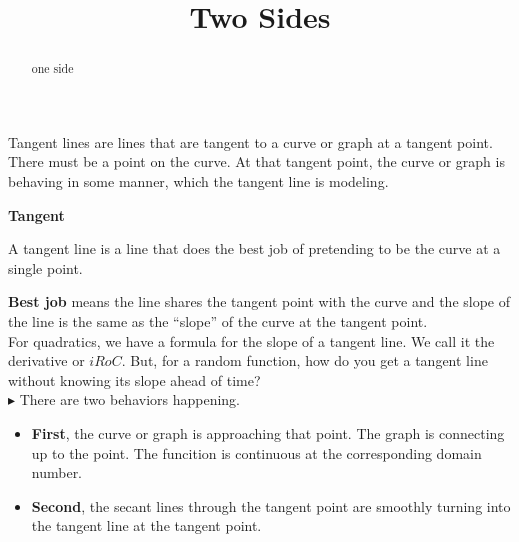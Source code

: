 \documentclass{ximera}
\title{Two Sides}
\begin{document}
\begin{abstract}
one side
\end{abstract}
\maketitle



Tangent lines are lines that are tangent to a curve or graph at a tangent point. There must be a point on the curve. At that tangent point, the curve or graph is behaving in some manner, which the tangent line is modeling.  \\

\begin{idea} \textbf{\textcolor{blue!55!black}{Tangent}}


A tangent line is a line that does the best job of pretending to be the curve at a single point.
\end{idea}


\textbf{Best job} means the line shares the tangent point with the curve and the slope of the line is the same as the ``slope'' of the curve at the tangent point. \\


For quadratics, we have a formula for the slope of a tangent line. We call it the derivative or $iRoC$. But, for a random function, how do you get a tangent line without knowing its slope ahead of time? \\


\textbf{\textcolor{red!90!darkgray}{$\blacktriangleright$}} There are two behaviors happening. \\



\begin{itemize}
\item \textbf{First}, the curve or graph is approaching that point. The graph is connecting up to the point. The funcition is continuous at the corresponding domain number.\\
\item \textbf{Second}, the secant lines through the tangent point are smoothly turning into the tangent line at the tangent point. \\
\end{itemize}
\end{document}
